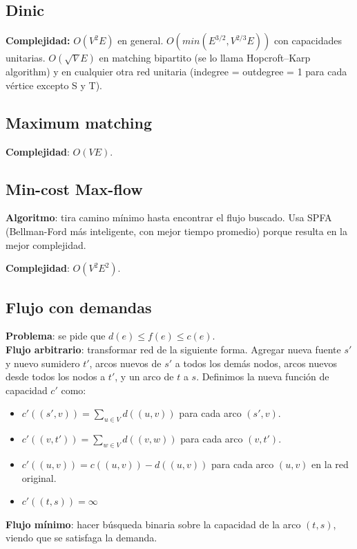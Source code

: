 {\subsection{Dinic}
\textbf{Complejidad: } $O(V^2E)$ en general. $O(min(E^{3/2}, V^{2/3}E))$ con capacidades unitarias. $O(\sqrt{V}E)$ en matching bipartito (se lo llama Hopcroft–Karp algorithm) y en cualquier otra red unitaria (indegree = outdegree = 1 para cada vértice excepto S y T). 

\subsection{Maximum matching}
\textbf{Complejidad}: $O(VE)$.

\subsection{Min-cost Max-flow}
\textbf{Algoritmo}: tira camino mínimo hasta encontrar el flujo buscado. Usa SPFA (Bellman-Ford más inteligente, con mejor
tiempo promedio) porque resulta en la mejor complejidad.

\textbf{Complejidad}: $O(V^2E^2)$.

\subsection{Flujo con demandas}
\textbf{Problema}: se pide que $d(e) \leq f(e) \leq c(e)$. \\
\textbf{Flujo arbitrario}: transformar red de la siguiente forma. Agregar nueva fuente $s'$ y nuevo sumidero $t'$,
arcos nuevos de $s'$ a todos los demás nodos, arcos nuevos desde todos los nodos a $t'$, y un arco de $t$ a $s$.
Definimos la nueva función de capacidad $c'$ como:
\begin{itemize}
\item $c'((s',v)) = \sum\nolimits_{u \in V} d((u,v))$ para cada arco $(s',v)$.
\item $c'((v,t')) = \sum\nolimits_{w \in V} d((v,w))$ para cada arco $(v,t')$.
\item $c'((u,v)) = c((u,v)) - d((u,v))$ para cada arco $(u,v)$ en la red original.
\item $c'((t,s)) = \infty$
\end{itemize}
\textbf{Flujo mínimo}: hacer búsqueda binaria sobre la capacidad de la arco $(t, s)$, viendo que se satisfaga la demanda.

}
